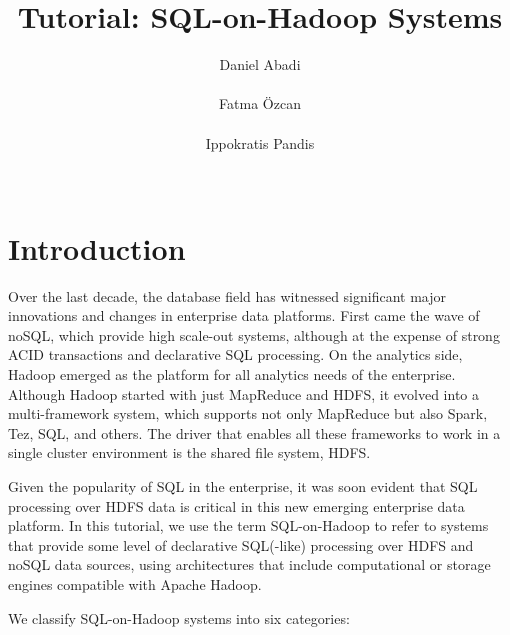 \documentclass{vldb}
\begin{document}
\title{Tutorial: SQL-on-Hadoop Systems}


\author{
\alignauthor
Daniel Abadi\\
\\
\alignauthor
Fatma  {\"O}zcan\\
\\
\alignauthor
Ippokratis Pandis\\
\\
}



\maketitle




\section{Introduction}

Over the last decade, the database field has witnessed significant major innovations and changes in enterprise data platforms. First came the wave of noSQL, which provide high scale-out systems, although at the expense of strong ACID transactions and declarative SQL processing. On the analytics side, Hadoop emerged as the platform for all analytics needs of the enterprise. Although Hadoop started with just MapReduce and HDFS, it evolved into a multi-framework system, which supports not only MapReduce but also Spark, Tez, SQL, and others. The driver that enables all these frameworks to work in a single cluster environment is the shared file system, HDFS. 

Given the popularity of SQL in the enterprise, it was soon evident that SQL processing over HDFS data is critical in this new emerging enterprise data platform. In this tutorial, we use the term SQL-on-Hadoop to refer to systems that provide some level of declarative SQL(-like) processing over HDFS and noSQL data sources, using architectures that include computational or storage engines compatible with Apache Hadoop.

We classify SQL-on-Hadoop systems into six categories:
\end{document}
